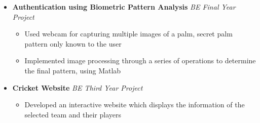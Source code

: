 \begin{itemize}

	\item \textbf{Authentication using Biometric Pattern Analysis} \hfill \emph{BE Final Year Project} \\[-0.6cm]
	\begin{itemize}
	      \item Used webcam for capturing multiple images of a palm, secret palm pattern only known to the user \\[-0.5cm]
	      \item Implemented image processing through a series of operations to determine the final pattern, using Matlab \\[-0.6cm]
	\end{itemize}

	\item \textbf{Cricket Website} \hfill \emph{BE Third Year Project} \\[-0.6cm]
	\begin{itemize}
	      \item Developed an interactive website which displays the information of the selected team and their players
	\end{itemize}

\end{itemize}
